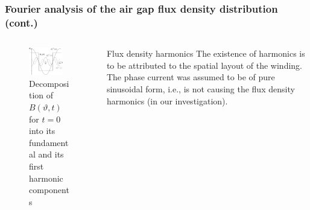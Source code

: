 \begin{frame}
	\frametitle{Fourier analysis of the air gap flux density distribution (cont.)}
    \begin{columns}
        \begin{column}{0.6\textwidth}
            \begin{figure}
            \centering
            \includegraphics[width=0.825\textwidth]{fig/lec05/B_single_phase_harmonics.pdf}
            \caption{Decomposition of $B(\vartheta, t)$ for $t=0$ into its fundamental and its first harmonic components}
            \label{fig:B_single_phase_harmonics}
        \end{figure}
        \end{column}
        \pause
        \begin{column}{0.4\textwidth}
            \begin{varblock}{Flux density harmonics}
                The existence of harmonics is to be attributed to the spatial layout of the winding. The phase current was assumed to be of pure sinusoidal form, i.e., is not causing the flux density harmonics (in our investigation).
            \end{varblock}
        \end{column}
    \end{columns}
\end{frame}

